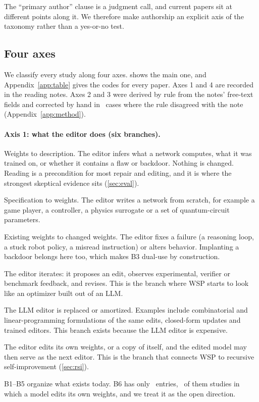 The ``primary author'' clause is a judgment call, and current papers sit at different points along it. We therefore make authorship an explicit axis of the taxonomy rather than a yes-or-no test.

\subsection{Four axes}

We classify every study along four axes.  shows the main one, and Appendix~\ref{app:table} gives the codes for every paper. Axes 1 and 4 are recorded in the reading notes. Axes 2 and 3 were derived by rule from the notes' free-text fields and corrected by hand in \nCodeOverrides\ cases where the rule disagreed with the note (Appendix~\ref{app:method}).

\paragraph{Axis 1: what the editor does (six branches).}
\begin{description}[leftmargin=1.2em,itemsep=2pt]
\item[B1 Reading.] Weights to description. The editor infers what a network computes, what it was trained on, or whether it contains a flaw or backdoor. Nothing is changed. Reading is a precondition for most repair and editing, and it is where the strongest skeptical evidence sits (\cref{sec:eval}).
\item[B2 Writing.] Specification to weights. The editor writes a network from scratch, for example a game player, a controller, a physics surrogate or a set of quantum-circuit parameters.
\item[B3 Repairing and editing.] Existing weights to changed weights. The editor fixes a failure (a reasoning loop, a stuck robot policy, a misread instruction) or alters behavior. Implanting a backdoor belongs here too, which makes B3 dual-use by construction.
\item[B4 Feedback and search loops.] The editor iterates: it proposes an edit, observes experimental, verifier or benchmark feedback, and revises. This is the branch where WSP starts to look like an optimizer built out of an LLM.
\item[B5 Efficient and non-LLM solvers.] The LLM editor is replaced or amortized. Examples include combinatorial and linear-programming formulations of the same edits, closed-form updates and trained editors. This branch exists because the LLM editor is expensive.
\item[B6 Self-editing.] The editor edits its own weights, or a copy of itself, and the edited model may then serve as the next editor. This is the branch that connects WSP to recursive self-improvement (\cref{sec:rsi}).
\end{description}
B1--B5 organize what exists today. B6 has only \nAnyBSix\ entries, \nSelfEditing\ of them studies in which a model edits its own weights, and we treat it as the open direction.

